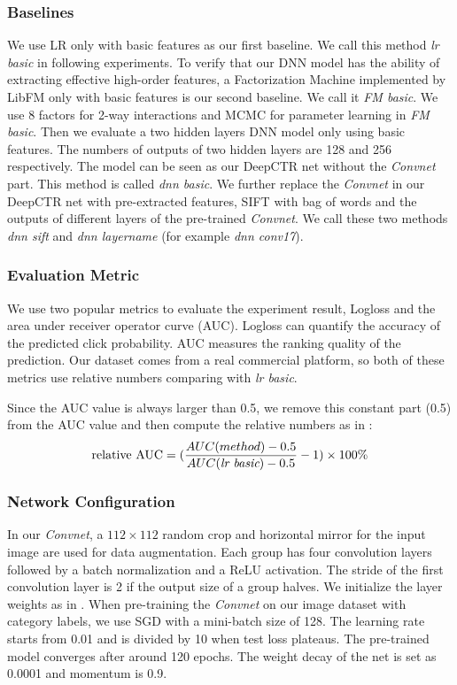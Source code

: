 \documentclass{sig-alternate-05-2015}
\begin{document}
\subsubsection{Baselines}
We use LR only with basic features as our first baseline. We call this method \emph{lr basic} in following experiments. To verify that our DNN model has the ability of extracting effective high-order features,  a Factorization Machine implemented by LibFM \cite{rendle2012factorization}  only with basic features is our second baseline.  We call it \emph{FM basic}. We use 8 factors for 2-way interactions and MCMC for parameter learning in \emph{FM basic}. Then we  evaluate a two hidden layers DNN model only using basic features. The numbers of outputs of two hidden layers  are 128 and 256 respectively. The model can be seen as our DeepCTR net without the \emph{Convnet} part. This method is called \emph{dnn basic}. We further replace the \emph{Convnet} in our DeepCTR net with pre-extracted features, SIFT \cite{lowe1999object} with bag of words and the outputs of different layers of the pre-trained  \emph{Convnet}. We call these two methods \emph{dnn sift} and \emph{dnn layername} (for example \emph{dnn conv17}). 
\subsubsection{Evaluation Metric}
We use two popular metrics to evaluate the experiment result, Logloss and the area under receiver operator curve (AUC).  Logloss can quantify the accuracy of the predicted click probability. AUC measures the ranking quality of the prediction. Our dataset comes from a real commercial platform, so both of these metrics use relative numbers comparing with \emph{lr basic}. 

Since the AUC value is always larger than 0.5, we remove this constant part (0.5) from the AUC value and then compute the relative numbers as in \cite{yan2014coupled}:
\begin{equation}
	\text{relative AUC} = (\frac{AUC(method) - 0.5}{AUC(\emph{lr basic})-0.5}-1) \times 100\% 
\end{equation}  
\subsubsection{Network Configuration}
In our \emph{Convnet},  a $112 \times 112$ random crop  and horizontal mirror for the input image are used for data augmentation. Each group has four convolution layers followed by a batch normalization \cite{ioffe2015batch} and a ReLU \cite{nair2010rectified} activation. The stride of the first convolution layer is 2 if the output size of a group halves.  We initialize the layer weights as in  \cite{he2015delving}. When pre-training the \emph{Convnet} on our image dataset with category labels,  we use SGD with a mini-batch size of 128. The learning rate starts from 0.01 and is divided by 10 when test loss plateaus. The pre-trained model converges after around 120 epochs. The weight decay of the net is set as 0.0001 and momentum is 0.9. 
\end{document}
